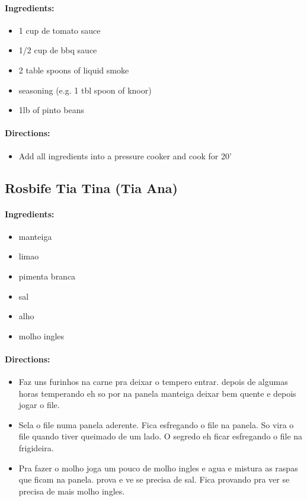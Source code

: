 \documentclass{article}
\begin{document}
\paragraph{Ingredients:}

\begin{itemize}
	\item 1 cup de tomato sauce
	\item 1/2 cup de bbq sauce
	\item 2 table spoons of liquid smoke
	\item seasoning (e.g. 1 tbl spoon of knoor)
	\item 1lb of pinto beans
\end{itemize}

\paragraph{Directions:}
\begin{itemize}
	\item Add all ingredients into a pressure cooker and cook for 20'
\end{itemize}

\subsection{Rosbife Tia Tina (Tia Ana)}

\paragraph{Ingredients:}

\begin{itemize}
	\item manteiga
	\item limao
	\item pimenta branca
	\item sal
	\item alho
	\item molho ingles
\end{itemize}

\paragraph{Directions:}
\begin{itemize}
	\item Faz uns furinhos na carne pra deixar o tempero entrar. depois de algumas horas temperando eh so por na panela manteiga deixar bem quente e depois jogar o file.
	\item Sela o file numa panela aderente. Fica esfregando o file na panela. So vira o file quando tiver queimado de um lado. O segredo eh ficar esfregando o file na frigideira.
	\item Pra fazer o molho joga um pouco de molho ingles e agua e mistura as raspas que ficam na panela. prova e ve se precisa de sal. Fica provando pra ver se precisa de mais molho ingles.
\end{itemize}
\end{document}
